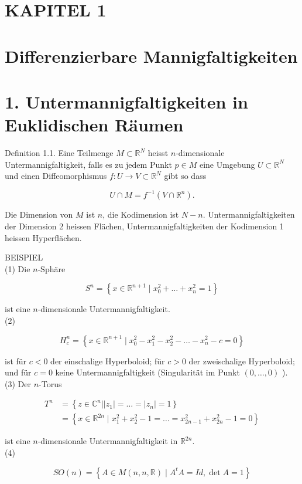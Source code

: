 \documentclass[10pt]{article}
\begin{document}
\section*{KAPITEL 1}
\section*{Differenzierbare Mannigfaltigkeiten}
\section*{1. Untermannigfaltigkeiten in Euklidischen Räumen}
Definition 1.1. Eine Teilmenge $M \subset \mathbb{R}^{N}$ heisst $n$-dimensionale Untermannigfaltigkeit, falls es zu jedem Punkt $p \in M$ eine Umgebung $U \subset \mathbb{R}^{N}$ und einen Diffeomorphismus $f: U \rightarrow V \subset \mathbb{R}^{N}$ gibt so dass

$$
U \cap M=f^{-1}\left(V \cap \mathbb{R}^{n}\right) .
$$

Die Dimension von $M$ ist $n$, die Kodimension ist $N-n$. Untermannigfaltigkeiten der Dimension 2 heissen Flächen, Untermannigfaltigkeiten der Kodimension 1 heissen Hyperflächen.

BEISPIEL\\
(1) Die $n$-Sphäre

$$
S^{n}=\left\{x \in \mathbb{R}^{n+1} \mid x_{0}^{2}+\ldots+x_{n}^{2}=1\right\}
$$

ist eine $n$-dimensionale Untermannigfaltigkeit.\\
(2)

$$
H_{c}^{n}=\left\{x \in \mathbb{R}^{n+1} \mid x_{0}^{2}-x_{1}^{2}-x_{2}^{2}-\ldots-x_{n}^{2}-c=0\right\}
$$

ist für $c<0$ der einschalige Hyperboloid; für $c>0$ der zweischalige Hyperboloid; und für $c=0$ keine Untermannigfaltigkeit (Singularität im Punkt $(0, \ldots, 0)$ ).\\
(3) Der $n$-Torus

$$
\begin{aligned}
T^{n} & =\left\{z \in \mathbb{C}^{n}| | z_{1}\left|=\ldots=\left|z_{n}\right|=1\right\}\right. \\
& =\left\{x \in \mathbb{R}^{2 n} \mid x_{1}^{2}+x_{2}^{2}-1=\ldots=x_{2 n-1}^{2}+x_{2 n}^{2}-1=0\right\}
\end{aligned}
$$

ist eine $n$-dimensionale Untermannigfaltigkeit in $\mathbb{R}^{2 n}$.\\
(4)

$$
S O(n)=\left\{A \in M(n, n, \mathbb{R}) \mid A^{t} A=I d, \operatorname{det} A=1\right\}
$$
\end{document}
